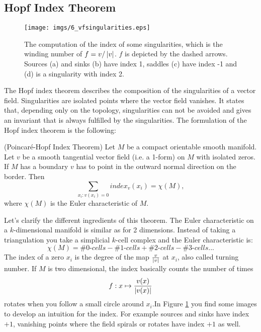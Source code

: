 
\subsection{Hopf Index Theorem}

\begin{figure}%
\begin{center}
\texttt{[image: imgs/6\_vfsingularities.eps]}%
\end{center}
\caption{The computation of the index of some singularities, which is the winding number of $f = v / \left| v \right|$. $f$ is depicted by the dashed arrows. Sources (a) and sinks (b) have index 1, saddles (c) have index -1 and (d) is a singularity with index 2. }%
\label{fig:vfsingularities}%
\end{figure}

The Hopf index theorem  describes the composition of the singularities of a vector field. Singularities are isolated points where the vector field vanishes. It states that, depending only on the topology, singularities can not be avoided and gives an invariant that is always fulfilled by the singularities. 
The formulation of the Hopf index theorem is the following:
\begin{thm}(Poincar\'e-Hopf Index Theorem) Let $M$ be a compact orientable smooth manifold. Let $v$ be a smooth tangential vector field (i.e. a 1-form) on $M$ with isolated zeros. If $M$ has a boundary $v$ has to point in the outward normal direction on the border. Then
\[\sum_{x_i: v(x_i) = 0} index_v(x_i) = \chi(M),\]
where $\chi(M)$ is the Euler characteristic of $M$.
\end{thm}
Let's clarify the different ingredients of this theorem. The Euler characteristic on a $k$-dimensional manifold is similar as for 2 dimensions. Instead of taking a triangulation you take a simplicial $k$-cell complex and the Euler characteristic is:
\[\chi(M) = \# \textit{0-cells} - \# \textit{1-cells} + \# \textit{2-cells} - \# \textit{3-cells} ...\]
The index of a zero $x_i$ is the degree of the map $\frac{v}{\left| v \right|}$ at $x_i$, also called turning number. If $M$ is two dimensional, the index basically counts the number of times 
\[f: x \mapsto \frac{v(x)}{\left| v(x) \right|}\] 
rotates when you follow a small circle around $x_i$.In Figure \ref{fig:vfsingularities} you find some images to develop an intuition for the index. For example sources and sinks have index $+1$, vanishing points where the field spirals or rotates have index $+1$ as well.

